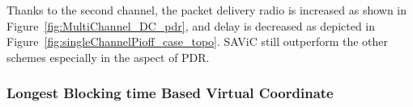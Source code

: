 Thanks to the second channel, the packet delivery radio is increased as shown in Figure~\ref{fig:MultiChannel_DC_pdr}, and delay is decreased as depicted in Figure~\ref{fig:singleChannelPioff_case_topo}.
SAViC still outperform the other schemes especially in the aspect of PDR.






\subsubsection*{Longest Blocking time Based Virtual Coordinate}    \mbox{}
\label{subsection:blocking_time}


